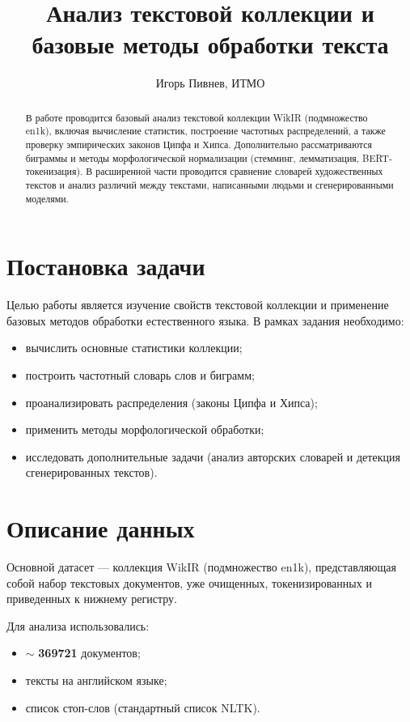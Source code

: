 \documentclass[11pt]{article}
\title{Анализ текстовой коллекции и базовые методы обработки текста}
\author{Игорь Пивнев, ИТМО}
\begin{document}
\maketitle

\begin{abstract}
В работе проводится базовый анализ текстовой коллекции WikIR (подмножество en1k),
включая вычисление статистик, построение частотных распределений, а также проверку
эмпирических законов Ципфа и Хипса. Дополнительно рассматриваются биграммы и
методы морфологической нормализации (стемминг, лемматизация, BERT-токенизация).
В расширенной части проводится сравнение словарей художественных текстов и анализ
различий между текстами, написанными людьми и сгенерированными моделями.
\end{abstract}

\section{Постановка задачи}

Целью работы является изучение свойств текстовой коллекции и применение базовых
методов обработки естественного языка. В рамках задания необходимо:

\begin{itemize}
    \item вычислить основные статистики коллекции;
    \item построить частотный словарь слов и биграмм;
    \item проанализировать распределения (законы Ципфа и Хипса);
    \item применить методы морфологической обработки;
    \item исследовать дополнительные задачи (анализ авторских словарей и детекция
    сгенерированных текстов).
\end{itemize}

\section{Описание данных}

Основной датасет — коллекция WikIR (подмножество en1k), представляющая собой набор
текстовых документов, уже очищенных, токенизированных и приведенных к нижнему регистру.

Для анализа использовались:
\begin{itemize}
    \item $\sim$ \textbf{369721} документов;
    \item тексты на английском языке;
    \item список стоп-слов (стандартный список NLTK).
\end{itemize}
\end{document}
